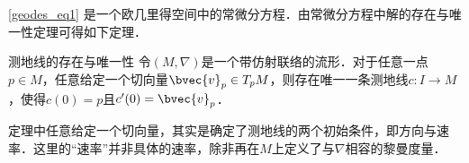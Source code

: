 \autoref{geodes_eq1} 是一个欧几里得空间中的常微分方程．由常微分方程中解的存在与唯一性定理可得如下定理．

\begin{theorem}{测地线的存在与唯一性}
令$(M, \nabla)$是一个带仿射联络的流形．对于任意一点$p\in M$，任意给定一个切向量$\bvec{v}_p\in T_pM$，则存在唯一一条测地线$c:I\to M$，使得$c(0)=p$且$c'(0)=\bvec{v}_p$．
\end{theorem}

定理中任意给定一个切向量，其实是确定了测地线的两个初始条件，即方向与速率．这里的“速率”并非具体的速率，除非再在$M$上定义了与$\nabla$相容的黎曼度量．

















